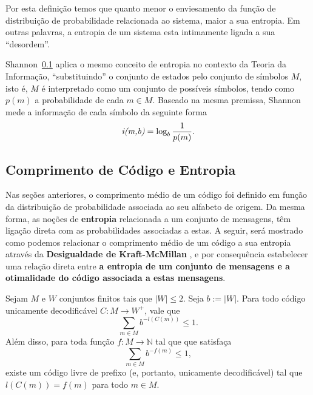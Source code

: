 Por esta definição temos que quanto menor o enviesamento da função de distribuição de probabilidade relacionada ao sistema, maior a sua entropia. Em outras palavras, a entropia de um sistema esta intimamente ligada a sua ``desordem''.

Shannon~\ref{} aplica o mesmo conceito de entropia no contexto da Teoria da Informação, ``substituindo'' o conjunto de estados pelo conjunto de símbolos $M$, isto é, $M$ é interpretado como um conjunto de possíveis símbolos, tendo como $p(m)$ a probabilidade de cada $m \in M$.
Baseado na mesma premissa, Shannon mede a informação de cada símbolo da seguinte forma
\begin{equation} \label{label:info_quantity}
\emph{i(m,b)} = \log_b \frac{1}{p(m)}.
\end{equation}

\subsection{Comprimento de Código e Entropia}
Nas seções anteriores, o comprimento médio de um código  foi definido em função da distribuição de probabilidade associada ao seu alfabeto de origem.
Da mesma forma, as noções de \textbf{entropia} relacionada a um conjunto de mensagens, têm ligação direta com as probabilidades associadas a estas. 
A seguir, será mostrado como podemos relacionar o comprimento médio de um código a sua entropia através da \textbf{Desigualdade de Kraft-McMillan} , e por consequência estabelecer uma relação direta entre \textbf{a entropia de um conjunto de mensagens e a otimalidade do código associada a estas mensagens}.

\begin{theorem}
  \label{thm:kraftmc}
  Sejam $M$ e $W$ conjuntos finitos tais que $|W|\leq 2$. Seja $b :=
  |W|$. Para todo código unicamente decodificável $C: M \to W^+$, vale
  que
  \begin{equation}
    \label{eq:cond_kraft_nec}
    \sum_{m\in M} b^{-l(C(m))} \leq 1.
  \end{equation}
  Além disso, para toda função $f: M\to\mathbb{N}$ tal que
  que satisfaça
  \begin{equation}
    \label{eq:cond_kraft_suf}
    \sum_{m \in M} b^{-f(m)} \leq 1,
  \end{equation}
  existe um código livre de prefixo (e, portanto, unicamente
  decodificável) tal que $l(C(m)) = f(m)$ para todo $m\in M$.
\end{theorem}

